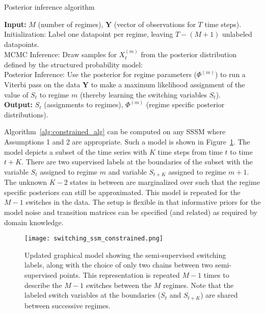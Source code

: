 \LinesNotNumbered
\begin{algorithm}
\caption{Posterior inference algorithm}\label{alg:constrained_alg}
\textbf{Input: } $M$ (number of regimes), $\mathbf{Y}$ (vector of observations for $T$ time steps).\\
\nextnr
Initialization: Label one datapoint per regime, leaving $T - (M+1)$ unlabeled datapoints.\\
\nextnr
MCMC Inference: Draw samples for $X_{t}^{(m)}$ from the posterior distribution defined by the structured probability model:\\
\nextnr
Posterior Inference: Use the posterior for regime parameters ($\Phi^{(m)}$) to run a Viterbi pass on the data $\mathbf{Y}$ to make a maximum likelihood assignment of the value of $S_t$ to regime $m$ (thereby learning the switching variables $S_t$).\\
\textbf{Output: } $S_t$ (assignments to regimes), $\Phi^{(m)}$ (regime specific posterior distributions).
\end{algorithm}

 Algorithm~\ref{alg:constrained_alg} can be computed on any SSSM where Assumptions 1 and 2 are appropriate. Such a model is shown in Figure~\ref{fig:updated_ssm_graphical_model}. The model depicts a subset of the time series with $K$ time steps from time $t$ to time $t+K$. There are two supervised labels at the boundaries of the subset with the variable $S_t$ assigned to regime $m$ and variable $S_{t+K}$ assigned to regime $m+1$. The unknown $K-2$ states in between are marginalized over such that the regime specific posteriors can still be approximated. This model is repeated for the $M-1$ switches in the data. The setup is flexible in that informative priors for the model noise and transition matrices can be specified (and related) as required by domain knowledge.

\begin{figure}
  \centering
  \texttt{[image: switching\_ssm\_constrained.png]}
  \caption{Updated graphical model showing the semi-supervised switching labels, along with the choice of only two chains between two semi-supervised points. This representation is repeated $M-1$ times to describe the $M-1$ switches between the $M$ regimes. Note that the labeled switch variables at the boundaries ($S_t$ and $S_{t+K}$) are shared between successive regimes.}
  \label{fig:updated_ssm_graphical_model}
\end{figure}

